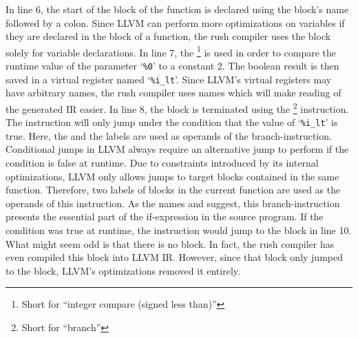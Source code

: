 In line 6, the start of the  block of the  function is declared using the block's name followed by a colon.
Since LLVM can perform more optimizations on variables if they are declared in the  block of a function,
the rush compiler uses the  block solely for variable declarations.
In line 7, the \footnote{Short for \enquote{integer compare (signed less than)}} is used in order to compare the runtime value of the parameter `\texttt{\%0}' to a constant 2.
The boolean result is then saved in a virtual register named `\texttt{\%i\_lt}'.
Since LLVM's virtual registers may have arbitrary names,
the rush compiler uses names which will make reading of the generated IR easier.
In line 8, the block is terminated using the \footnote{Short for \enquote{branch}} instruction.
The instruction will only jump under the condition that the value of `\texttt{\%i\_lt}' is true.
Here, the  and the  labels are used as operands of the branch-instruction.
Conditional jumps in LLVM always require an alternative jump to perform if the condition is false at runtime.
Due to constraints introduced by its internal optimizations, LLVM only allows jumps to target blocks contained in the same function.
Therefore, two labels of blocks in the current function are used as the operands of this instruction.
As the names  and  suggest, this branch-instruction presents the essential part of the if-expression in the source program.
If the condition was true at runtime, the instruction would jump to the  block in line 10.
What might seem odd is that there is no  block.
In fact, the rush compiler has even compiled this block into LLVM IR\@.
However, since that block only jumped to the  block, LLVM's optimizations removed it entirely.

